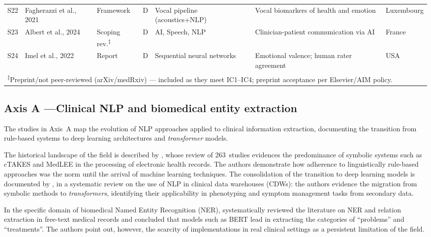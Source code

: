 \documentclass[review,12pt]{elsarticle}
\begin{document}
\begin{longtable}{p{0.65cm} p{2.4cm} p{1.55cm} p{0.55cm} p{2.2cm} p{2.35cm} p{1.4cm}}
S22 & Fagherazzi et al., 2021 & Framework   & D & Vocal pipeline (acoustics+NLP) & Vocal biomarkers of health and emotion & Luxembourg \\
S23 & Albert et al., 2024    & Scoping rev.\textsuperscript{‡} & D & AI, Speech, NLP & Clinician-patient communication via AI & France  \\
S24 & Imel et al., 2022      & Report       & D & Sequential neural networks & Emotional valence; human rater agreement & USA         \\
\midrule
\multicolumn{7}{l}{\footnotesize\parbox{13.5cm}{%
  \textsuperscript{‡}Preprint/not peer-reviewed (arXiv/medRxiv) --- included as they meet IC1--IC4; preprint acceptance per Elsevier/AIM policy.}} \\
\end{longtable}

\subsection{Axis A —Clinical NLP and biomedical entity extraction}
\label{subsec:eixoA}

The studies in Axis~A map the evolution of NLP approaches applied to clinical
information extraction, documenting the transition from rule-based systems to
deep learning architectures and \textit{transformer} models.

The historical landscape of the field is described by \citet{Wang2018}, whose
review of 263~studies evidences the predominance of symbolic systems such as
cTAKES and MedLEE in the processing of electronic health records. The authors
demonstrate how adherence to linguistically rule-based approaches was the norm
until the arrival of machine learning techniques. The consolidation of the
transition to deep learning models is documented by \citet{Bazoge2023}, in a
systematic review on the use of NLP in clinical data warehouses (CDWs): the
authors evidence the migration from symbolic methods to \textit{transformers},
identifying their applicability in phenotyping and symptom management tasks
from secondary data.

In the specific domain of biomedical Named Entity Recognition (NER),
\citet{Navarro2023} systematically reviewed the literature on NER and relation
extraction in free-text medical records and concluded that models such as BERT
lead in extracting the categories of ``problems'' and ``treatments''. The
authors point out, however, the scarcity of implementations in real clinical
settings as a persistent limitation of the field.
\end{document}
